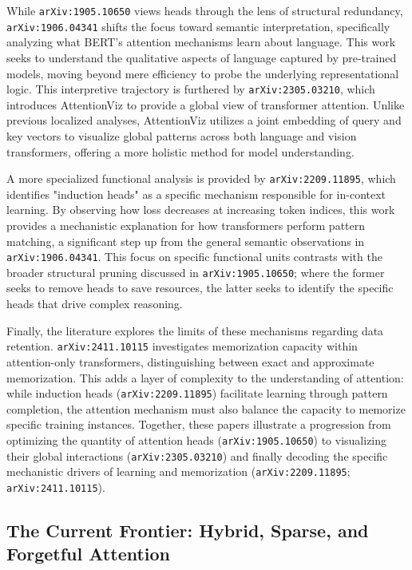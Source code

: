 \documentclass[11pt]{article}
\begin{document}
While \texttt{arXiv:1905.10650} views heads through the lens of structural redundancy, \texttt{arXiv:1906.04341} shifts the focus toward semantic interpretation, specifically analyzing what BERT’s attention mechanisms learn about language. This work seeks to understand the qualitative aspects of language captured by pre-trained models, moving beyond mere efficiency to probe the underlying representational logic. This interpretive trajectory is furthered by \texttt{arXiv:2305.03210}, which introduces AttentionViz to provide a global view of transformer attention. Unlike previous localized analyses, AttentionViz utilizes a joint embedding of query and key vectors to visualize global patterns across both language and vision transformers, offering a more holistic method for model understanding.

A more specialized functional analysis is provided by \texttt{arXiv:2209.11895}, which identifies "induction heads" as a specific mechanism responsible for in-context learning. By observing how loss decreases at increasing token indices, this work provides a mechanistic explanation for how transformers perform pattern matching, a significant step up from the general semantic observations in \texttt{arXiv:1906.04341}. This focus on specific functional units contrasts with the broader structural pruning discussed in \texttt{arXiv:1905.10650}; where the former seeks to remove heads to save resources, the latter seeks to identify the specific heads that drive complex reasoning.

Finally, the literature explores the limits of these mechanisms regarding data retention. \texttt{arXiv:2411.10115} investigates memorization capacity within attention-only transformers, distinguishing between exact and approximate memorization. This adds a layer of complexity to the understanding of attention: while induction heads (\texttt{arXiv:2209.11895}) facilitate learning through pattern completion, the attention mechanism must also balance the capacity to memorize specific training instances. Together, these papers illustrate a progression from optimizing the quantity of attention heads (\texttt{arXiv:1905.10650}) to visualizing their global interactions (\texttt{arXiv:2305.03210}) and finally decoding the specific mechanistic drivers of learning and memorization (\texttt{arXiv:2209.11895}; \texttt{arXiv:2411.10115}).

\subsection{The Current Frontier: Hybrid, Sparse, and Forgetful Attention}
\end{document}
